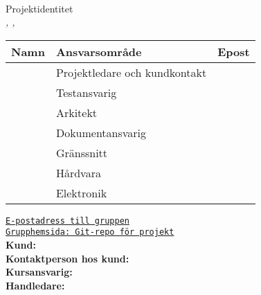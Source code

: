 \documentclass[kravspec/krav.tex]{subfiles}
\newenvironment{projektidentitet}{%
{\ }\vspace{30mm}
\renewcommand{\arraystretch}{2}
\begin{center}
  {\huge Projektidentitet\\[1ex]}
  \textsl{\VARgruppnummer, \LIPSdatum, \VARprojekttitel}\\[1cm]
    \begin{tabular}{lp{60mm}r}
      \hline
      \textbf{Namn} &
      \textbf{Ansvarsområde} &
      \textbf{Epost} \\
	\hline
      }%
      {%
      \hline
    \end{tabular}
\end{center}
}
\newcommand{\gruppmedlem}[3]{{#1} & {#2} & {#3} \\}
\begin{document}
\thispagestyle{empty}

\begin{projektidentitet}
\gruppmedlem{\VARprojektledare}{Projektledare och kundkontakt}
    {\href{mailto:\VARprojektledaremail}
    {\texttt{\VARprojektledaremail}}}
\gruppmedlem{\VARkundansvarig}{Testansvarig}
    {\href{mailto:\VARkundansvarigmail}
    {\texttt{\VARkundansvarigmail}}}
\gruppmedlem{\VARarkitekt}{Arkitekt}
    {\href{mailto:\VARarkitektmail}
    {\texttt{\VARarkitektmail}}}
\gruppmedlem{\VARdokumentansvarig}{Dokumentansvarig}
    {\href{mailto:\VARdokumentansvarigmail}
    {\texttt{\VARdokumentansvarigmail}}}
\gruppmedlem{\VARgranssnitt}{Gränssnitt}
    {\href{mailto:\VARgranssnittmail}
    {\texttt{\VARgranssnittmail}}}
\gruppmedlem{\VARhardware}{Hårdvara}
    {\href{mailto:\VARhardwaremail}
    {\texttt{\VARhardwaremail}}}
\gruppmedlem{\VARelektronik}{Elektronik}
    {\href{mailto:\VARelektronikmail}
    {\texttt{\VARelektronikmail}}}
\end{projektidentitet}

\begin{center}
\vspace{0.5cm}
{\href{mailto:\VARdokumentansvarigmail,\VARarkitektmail,\VARprojektledaremail,
    \VARgranssnittmail,\VARprojektledaremail,\VARhardwaremail,
    \VARelektronikmail,\VARkundansvarigmail}{
\texttt{E-postadress till gruppen}}}\\

{\href{\VARgrupphemsida}{
\texttt{Grupphemsida: Git-repo för projekt}}}\\[1cm]

{\textbf{Kund:} \VARbestallare}\\[0.5ex]
{\textbf{Kontaktperson hos kund:} \VARkontaktperson}\\[1cm]

{\textbf{Kursansvarig:} \VARkursansvarig}\\[1ex]
{\textbf{Handledare:} \VARhandledare}

\end{center}
\newpage
\end{document}
